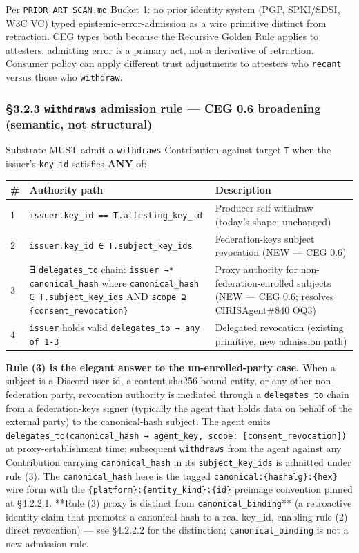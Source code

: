 \documentclass[11pt]{article}
\begin{document}
Per \texttt{PRIOR\_ART\_SCAN.md} Bucket 1: no prior identity system (PGP, SPKI/SDSI, W3C VC) typed epistemic-error-admission as a wire primitive distinct from retraction. CEG types both because the Recursive Golden Rule applies to attesters: admitting error is a primary act, not a derivative of retraction. Consumer policy can apply different trust adjustments to attesters who \texttt{recant} versus those who \texttt{withdraw}.


\subsubsection*{§3.2.3 \texttt{withdraws} admission rule — CEG 0.6 broadening (semantic, not structural)}



Substrate MUST admit a \texttt{withdraws} Contribution against target \texttt{T} when the issuer's \texttt{key\_id} satisfies \textbf{ANY} of:


{\footnotesize
\begin{longtable}{|p{5.33cm}|p{5.33cm}|p{5.33cm}|}\hline
\textbf{\#} & \textbf{Authority path} & \textbf{Description} \\ \hline\endhead
1 & \texttt{issuer.key\_id == T.attesting\_key\_id} & Producer self-withdraw (today's shape; unchanged) \\ \hline
2 & \texttt{issuer.key\_id ∈ T.subject\_key\_ids} & Federation-keys subject revocation (NEW — CEG 0.6) \\ \hline
3 & ∃ \texttt{delegates\_to} chain: \texttt{issuer →* canonical\_hash} where \texttt{canonical\_hash ∈ T.subject\_key\_ids} AND \texttt{scope ⊇ \{consent\_revocation\}} & Proxy authority for non-federation-enrolled subjects (NEW — CEG 0.6; resolves CIRISAgent\#840 OQ3) \\ \hline
4 & \texttt{issuer} holds valid \texttt{delegates\_to → any of 1-3} & Delegated revocation (existing primitive, new admission path) \\ \hline
\end{longtable}}


\textbf{Rule (3) is the elegant answer to the un-enrolled-party case.} When a subject is a Discord user-id, a content-sha256-bound entity, or any other non-federation party, revocation authority is mediated through a \texttt{delegates\_to} chain from a federation-keys signer (typically the agent that holds data on behalf of the external party) to the canonical-hash subject. The agent emits \texttt{delegates\_to(canonical\_hash → agent\_key, scope: [consent\_revocation])} at proxy-establishment time; subsequent \texttt{withdraws} from the agent against any Contribution carrying \texttt{canonical\_hash} in its \texttt{subject\_key\_ids} is admitted under rule (3). The \texttt{canonical\_hash} here is the tagged \texttt{canonical:\{hashalg\}:\{hex\}} wire form with the \texttt{\{platform\}:\{entity\_kind\}:\{id\}} preimage convention pinned at §4.2.2.1. **Rule (3) proxy is distinct from \texttt{canonical\_binding}** (a retroactive identity claim that promotes a canonical-hash to a real key\_id, enabling rule (2) direct revocation) — see §4.2.2.2 for the distinction; \texttt{canonical\_binding} is not a new admission rule.
\end{document}
